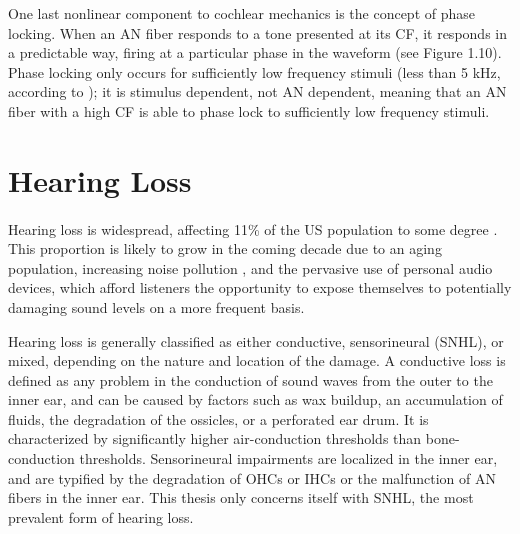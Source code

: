One last nonlinear component to cochlear mechanics is the concept of phase locking.  When an AN fiber responds to a tone presented at its CF, it responds in a predictable way, firing at a particular phase in the waveform (see Figure 1.10).  Phase locking only occurs for sufficiently low frequency stimuli (less than 5 kHz, according to \cite{Pickles2008}); it is stimulus dependent, not AN dependent, meaning that an AN fiber with a high CF is able to phase lock to sufficiently low frequency stimuli.

\section{Hearing Loss}
\paragraph{}Hearing loss is widespread, affecting 11\% of the US population to some degree \cite{Kochkin2009}.  This proportion is likely to grow in the coming decade due to an aging population, increasing noise pollution \cite{Goines2007}, and the pervasive use of personal audio devices, which afford listeners the opportunity to expose themselves to potentially damaging sound levels on a more frequent basis.

Hearing loss is generally classified as either conductive, sensorineural (SNHL), or mixed, depending on the nature and location of the damage.  A conductive loss is defined as any problem in the conduction of sound waves from the outer to the inner ear, and can be caused by factors such as wax buildup, an accumulation of fluids, the degradation of the ossicles, or a perforated ear drum.  It is characterized by significantly higher air-conduction thresholds than bone-conduction thresholds.  Sensorineural impairments are localized in the inner ear, and are typified by the degradation of OHCs or IHCs or the malfunction of AN fibers in the inner ear.  This thesis only concerns itself with SNHL, the most prevalent form of hearing loss.

